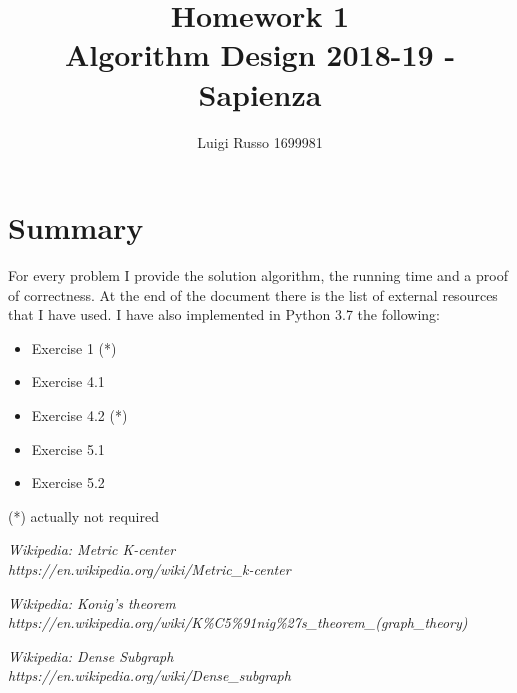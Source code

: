 \documentclass[12pt]{article}
\title{Homework 1\\
	\large Algorithm Design 2018-19 - Sapienza}
\author{Luigi Russo 1699981}
\begin{document}
	
\maketitle

\newpage
\tableofcontents
\newpage

\section*{Summary}
For every problem I provide the solution algorithm, the running time and a proof of correctness. At the end of the document there is the list of external resources that I have used. I have also implemented in Python 3.7 the following:
\begin{itemize}
	\item Exercise 1 (*)
	\item Exercise 4.1
	\item Exercise 4.2 (*)
	\item Exercise 5.1
	\item Exercise 5.2	
\end{itemize}
(*) actually not required







\begin{thebibliography}{10}
	
	\textsl{Wikipedia: Metric K-center} \\
	\textit{https://en.wikipedia.org/wiki/Metric\_k-center}

	\textsl{Wikipedia: Konig's theorem} \\
	\textit{https://en.wikipedia.org/wiki/K\%C5\%91nig\%27s\_theorem\_(graph\_theory)}
	
	\textsl{Wikipedia: Dense Subgraph} \\
	\textit{https://en.wikipedia.org/wiki/Dense\_subgraph}	
	
\end{thebibliography}
\end{document}
